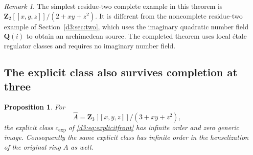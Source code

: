 \documentclass[11pt,a4paper]{amsart}
\numberwithin{equation}{section}
\newtheorem{proposition}[theorem]{Proposition}
\theoremstyle{definition}
\theoremstyle{remark}
\newtheorem{remark}[theorem]{Remark}
\newcommand{\Q}{\mathbf Q}
\newcommand{\Z}{\mathbf Z}
\begin{document}
\begin{remark}
The simplest residue-two complete example in this theorem is $\Z_2[[x,y,z]]/(2+xy+z^2)$. It is different from the noncomplete residue-two example of Section~\ref{d3:sec:two}, which uses the imaginary quadratic number field $\Q(i)$ to obtain an archimedean source. The completed theorem uses local \'etale regulator classes and requires no imaginary number field.
\end{remark}

\subsection{The explicit class also survives completion at three}\label{d3:sec:explicitcomplete}

\begin{proposition}\label{d3:prop:explicitcomplete}
For
\[
\widehat A=\Z_3[[x,y,z]]/(3+xy+z^2),
\]
the explicit class $c_{\mathrm{exp}}$ of \eqref{d3:eq:explicitfront} has infinite order and zero generic image. Consequently the same explicit class has infinite order in the henselization of the original ring $A$ as well.
\end{proposition}
\end{document}
